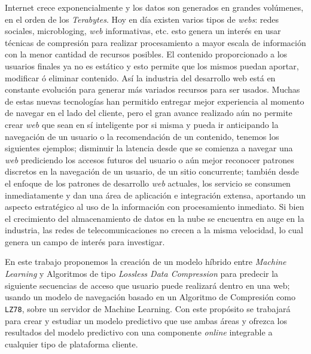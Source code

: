
Internet crece exponencialmente  y los datos son generados en grandes volúmenes, en el orden de los \emph{Terabytes}. Hoy en día existen varios tipos de \emph{webs}: redes sociales, microbloging, \emph{web} informativas, etc. esto genera un interés en usar técnicas de compresión para realizar procesamiento a mayor escala de información con la menor cantidad de recursos posibles. El contenido proporcionado a los usuarios finales ya no es estático y esto permite que los mismos puedan  aportar, modificar ó eliminar contenido. Así  la industria del desarrollo web está en constante evolución para generar más variados recursos para ser usados. Muchas de estas nuevas tecnologías han permitido entregar mejor experiencia al momento de navegar en el lado del cliente, pero el gran avance realizado aún no permite crear \emph{web} que sean en sí inteligente por si misma y pueda ir anticipando la  navegación de un usuario o la recomendación de un contenido, tenemos los siguientes ejemplos; disminuir la latencia desde que se comienza a navegar una \emph{web} prediciendo los accesos futuros del usuario o aún mejor reconocer patrones discretos en la navegación de un usuario,  de un sitio concurrente; también desde el enfoque de los patrones de desarrollo \emph{web} actuales, los servicio  se consumen inmediatamente y dan una área de aplicación e integración extensa, aportando un aspecto estratégico al uso de la información con procesamiento inmediato. Si bien el crecimiento del almacenamiento de datos en la nube se encuentra en auge en la industria, las redes de telecomunicaciones  no crecen a la misma velocidad, lo cual genera un campo de interés para investigar. 

En este trabajo proponemos  la creación de un modelo híbrido entre \emph{Machine Learning} y Algoritmos de tipo \emph{Lossless Data Compression} para predecir la siguiente secuencias de acceso que usuario puede realizará dentro en una web; usando un modelo de navegación basado en un Algoritmo de Compresión como \texttt{LZ78}, sobre un servidor de Machine Learning. Con este propósito se trabajará para crear y estudiar un modelo predictivo que use ambas áreas y  ofrezca los resultados del modelo predictivo con una componente \emph{online} integrable a cualquier tipo de plataforma cliente.